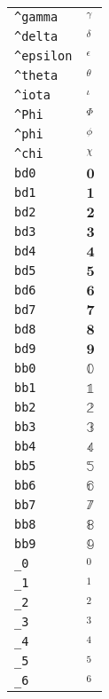 \begin{longtable}{ll}
\texttt{\textasciicircum gamma}&${}^\gamma {}$\\
\texttt{\textasciicircum delta}&${}^\delta {}$\\
\texttt{\textasciicircum epsilon}&${}^\epsilon {}$\\
\texttt{\textasciicircum theta}&${}^\theta {}$\\
\texttt{\textasciicircum iota}&${}^\iota {}$\\
\texttt{\textasciicircum Phi}&${}^\Phi {}$\\
\texttt{\textasciicircum phi}&${}^\phi {}$\\
\texttt{\textasciicircum chi}&${}^\chi {}$\\
\texttt{bd0}&${}{\textbf{0}}{}$\\
\texttt{bd1}&${}{\textbf{1}}{}$\\
\texttt{bd2}&${}{\textbf{2}}{}$\\
\texttt{bd3}&${}{\textbf{3}}{}$\\
\texttt{bd4}&${}{\textbf{4}}{}$\\
\texttt{bd5}&${}{\textbf{5}}{}$\\
\texttt{bd6}&${}{\textbf{6}}{}$\\
\texttt{bd7}&${}{\textbf{7}}{}$\\
\texttt{bd8}&${}{\textbf{8}}{}$\\
\texttt{bd9}&${}{\textbf{9}}{}$\\
\texttt{bb0}&${}{\mathbb{0}}{}$\\
\texttt{bb1}&${}{\mathbb{1}}{}$\\
\texttt{bb2}&${}{\mathbb{2}}{}$\\
\texttt{bb3}&${}{\mathbb{3}}{}$\\
\texttt{bb4}&${}{\mathbb{4}}{}$\\
\texttt{bb5}&${}{\mathbb{5}}{}$\\
\texttt{bb6}&${}{\mathbb{6}}{}$\\
\texttt{bb7}&${}{\mathbb{7}}{}$\\
\texttt{bb8}&${}{\mathbb{8}}{}$\\
\texttt{bb9}&${}{\mathbb{9}}{}$\\
\texttt{\_0}&${}_0 {}$\\
\texttt{\_1}&${}_1 {}$\\
\texttt{\_2}&${}_2 {}$\\
\texttt{\_3}&${}_3 {}$\\
\texttt{\_4}&${}_4 {}$\\
\texttt{\_5}&${}_5 {}$\\
\texttt{\_6}&${}_6 {}$\\

\end{longtable}
